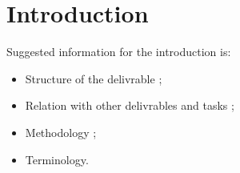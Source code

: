 
\clearpage
\section{Introduction}
\label{sec:introduction}


Suggested information for the introduction is:
\begin{itemize}
  \item Structure of the delivrable ;
  \item Relation with other delivrables and tasks ;
  \item Methodology ;
  \item Terminology.
\end{itemize}

